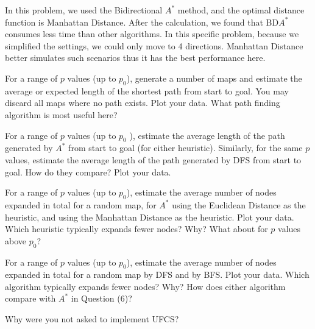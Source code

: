 \documentclass[letter]{article}
\begin{document}
\begin{questions}
	In this problem, we used the Bidirectional $ A^* $ method, and the optimal distance function is Manhattan Distance. After the calculation, we found that BD$ A^* $ consumes less time than other algorithms. In this specific problem, because we simplified the settings, we could only move to 4 directions. Manhattan Distance better simulates such scenarios thus it has the best performance here. \\
	
	
	\item {For a range of $ p $ values (up to $ p_0 $), generate a number of maps and estimate the average or expected length of the shortest path from start to goal. You may discard all maps where no path exists. Plot your data. What path finding algorithm is most useful here?}
	
	\item {For a range of $ p $ values (up to $ p_0 $ ), estimate the average length of the path generated by $ A^* $ from start to goal (for either heuristic). Similarly, for the same $ p $ values, estimate the average length of the path generated by DFS from start to goal. How do they compare? Plot your data.}
	
	\item {For a range of $ p $ values (up to $ p_0 $), estimate the average number of nodes expanded in total for a random map, for $ A^* $ using the Euclidean Distance as the heuristic, and using the Manhattan Distance as the heuristic. Plot your data. Which heuristic typically expands fewer nodes? Why? What about for $ p $ values above $ p_0 $?}
	
	\item {For a range of $ p $ values (up to $ p_0 $), estimate the average number of nodes expanded in total for a random map by DFS and by BFS. Plot your data. Which algorithm typically expands fewer nodes? Why? How does either algorithm compare with $ A^* $ in Question (6)?}
	
\end{questions}

\begin{bonus}
	\item {Why were you not asked to implement UFCS?}
\end{bonus}
\end{document}
